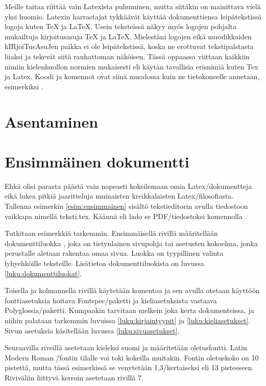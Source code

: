 Meille \marginpar{\Large\LaTeX} taitaa riittää vain Latexista puhuminen,
mutta siitäkin on mainittava vielä yksi huomio. Latexin harrastajat
tykkäävät käyttää dokumenttiensa leipätekstissä logoja kuten \TeX{} ja
\LaTeX{}. Usein teksteissä näkyy myös logojen pohjalta mukailtuja
kirjoitus\-asuja TeX ja LaTeX. Mielestäni logojen eikä muodikkaiden
kIRjoiTus\-AsuJen paikka ei ole leipätekstissä, koska ne erottuvat
tekstipalstasta liiaksi ja tekevät siitä rauhattoman näköisen. Tässä
oppaassa viittaan kaikkiin nimiin kielenhuollon normien mukaisesti eli
käytän tavallisia erisnimiä kuten Tex ja Latex. Koodi ja komennot ovat
siinä muodossa kuin ne tietokoneelle annetaan, esimerkiksi
.

\section{Asentaminen}
\label{luku:asentaminen}

\section{Ensimmäinen dokumentti}

Ehkä olisi parasta päästä vain nopeasti kokeilemaan omia
Latex\-/dokumentteja eikä lukea pitkiä jaaritteluja muinaisten
kreikkalaisten Latex\-/filosofiasta. Tallenna esimerkin
\ref{esim:ensimmainen} sisältö teksti\-editorin avulla tiedostoon
vaikkapa nimellä teksti.tex. Käännä eli lado se PDF\-/tiedostoksi
komennolla .

Tutkitaan esimerkkiä tarkemmin. Ensimmäisellä rivillä määritellään
dokumenttiluokka \textenglish{}, joka on tietynlainen
sivupohja tai asetusten kokoelma, jonka perustalle aletaan rakentaa omaa
sivua. Luokka \textenglish{} on tyypillinen valinta
lyhyehköille teksteille. Lisätietoa dokumenttiluokista on luvussa
\ref{luku:dokumenttiluokat}.

Toisella ja kolmannella rivillä käytetään komentoa  ja sen avulla otetaan käyttöön fontti\-asetuksia hoitava
Fontspec\-/paketti ja kieli\-asetuksista vastaava Polyglossia\-/paketti.
Kumpaakin tarvitaan melkein joka kerta dokumenteissa, ja niihin palataan
tarkemmin luvuissa \ref{luku:kirjaintyypit} ja
\ref{luku:kieliasetukset}. Sivun asetuksia käsitellään luvussa
\ref{luku:sivuasetukset}.

Seuraavilla riveillä asetetaan kieleksi suomi ja määritetään
oletusfontti. Latin Modern Roman \=/fontin tilalle voi toki kokeilla
muitakin. Fontin oletuskoko on 10 pistettä, mutta tässä esimerkissä se
venytetään 1,3\-/kertaiseksi eli 13 pisteeseen. Riviväliin liittyvä
kerroin asetetaan rivillä 7.

